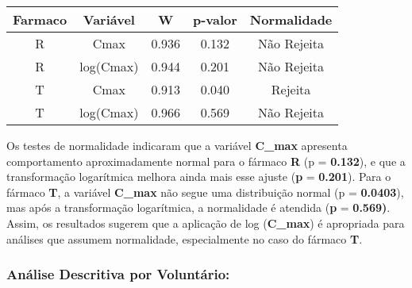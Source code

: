 \documentclass[
]{article}
\newenvironment{Shaded}{\begin{snugshade}}{\end{snugshade}}
\newcommand{\AttributeTok}[1]{\textcolor[rgb]{0.13,0.29,0.53}{#1}}
\newcommand{\DecValTok}[1]{\textcolor[rgb]{0.00,0.00,0.81}{#1}}
\newcommand{\FloatTok}[1]{\textcolor[rgb]{0.00,0.00,0.81}{#1}}
\newcommand{\FunctionTok}[1]{\textcolor[rgb]{0.13,0.29,0.53}{\textbf{#1}}}
\newcommand{\NormalTok}[1]{#1}
\newcommand{\SpecialCharTok}[1]{\textcolor[rgb]{0.81,0.36,0.00}{\textbf{#1}}}
\newcommand{\StringTok}[1]{\textcolor[rgb]{0.31,0.60,0.02}{#1}}
\begin{document}
\begin{Shaded}
\end{Shaded}

\begin{longtable}[]{@{}ccccc@{}}
\toprule\noalign{}
Farmaco & Variável & W & p-valor & Normalidade \\
\midrule\noalign{}
\endhead
\bottomrule\noalign{}
\endlastfoot
R & Cmax & 0.936 & 0.132 & Não Rejeita \\
R & log(Cmax) & 0.944 & 0.201 & Não Rejeita \\
T & Cmax & 0.913 & 0.040 & Rejeita \\
T & log(Cmax) & 0.966 & 0.569 & Não Rejeita \\
\end{longtable}

Os testes de normalidade indicaram que a variável \textbf{C\_max}
apresenta comportamento aproximadamente normal para o fármaco \textbf{R}
(p = \textbf{0.132}), e que a transformação logarítmica melhora ainda
mais esse ajuste (\textbf{p} = \textbf{0.201}). Para o fármaco
\textbf{T}, a variável \textbf{C\_max} não segue uma distribuição normal
(p = \textbf{0.0403}), mas após a transformação logarítmica, a
normalidade é atendida (\textbf{p} = \textbf{0.569)}. Assim, os
resultados sugerem que a aplicação de log (\textbf{C\_max}) é apropriada
para análises que assumem normalidade, especialmente no caso do fármaco
\textbf{T}.

\hypertarget{anuxe1lise-descritiva-por-voluntuxe1rio}{%
\subsubsection{Análise Descritiva por
Voluntário:}\label{anuxe1lise-descritiva-por-voluntuxe1rio}}
\end{document}
